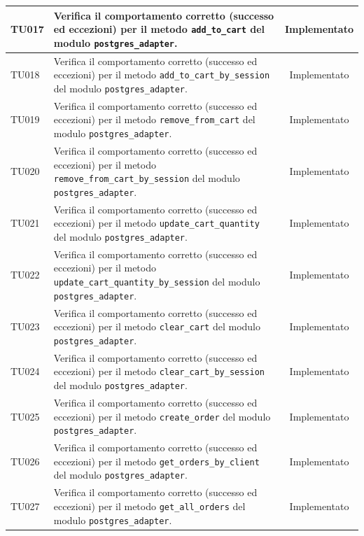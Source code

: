 \documentclass[a4paper,11pt,oneside]{scrartcl}
\begin{document}
\begin{longtable}{|p{1.9cm}|p{11.6cm}|c|}
    TU017           & Verifica il comportamento corretto (successo ed eccezioni) per il metodo \texttt{add\_to\_cart} del modulo \texttt{postgres\_adapter}.                       & Implementato   \\ \hline
    TU018           & Verifica il comportamento corretto (successo ed eccezioni) per il metodo \texttt{add\_to\_cart\_by\_session} del modulo \texttt{postgres\_adapter}.          & Implementato   \\ \hline
    TU019           & Verifica il comportamento corretto (successo ed eccezioni) per il metodo \texttt{remove\_from\_cart} del modulo \texttt{postgres\_adapter}.                  & Implementato   \\ \hline
    TU020           & Verifica il comportamento corretto (successo ed eccezioni) per il metodo \texttt{remove\_from\_cart\_by\_session} del modulo \texttt{postgres\_adapter}.     & Implementato   \\ \hline
    TU021           & Verifica il comportamento corretto (successo ed eccezioni) per il metodo \texttt{update\_cart\_quantity} del modulo \texttt{postgres\_adapter}.              & Implementato   \\ \hline
    TU022           & Verifica il comportamento corretto (successo ed eccezioni) per il metodo \texttt{update\_cart\_quantity\_by\_session} del modulo \texttt{postgres\_adapter}. & Implementato   \\ \hline
    TU023           & Verifica il comportamento corretto (successo ed eccezioni) per il metodo \texttt{clear\_cart} del modulo \texttt{postgres\_adapter}.                         & Implementato   \\ \hline
    TU024           & Verifica il comportamento corretto (successo ed eccezioni) per il metodo \texttt{clear\_cart\_by\_session} del modulo \texttt{postgres\_adapter}.            & Implementato   \\ \hline
    TU025           & Verifica il comportamento corretto (successo ed eccezioni) per il metodo \texttt{create\_order} del modulo \texttt{postgres\_adapter}.                       & Implementato   \\ \hline
    TU026           & Verifica il comportamento corretto (successo ed eccezioni) per il metodo \texttt{get\_orders\_by\_client} del modulo \texttt{postgres\_adapter}.             & Implementato   \\ \hline
    TU027           & Verifica il comportamento corretto (successo ed eccezioni) per il metodo \texttt{get\_all\_orders} del modulo \texttt{postgres\_adapter}.                    & Implementato   \\ \hline

\end{longtable}
\end{document}
